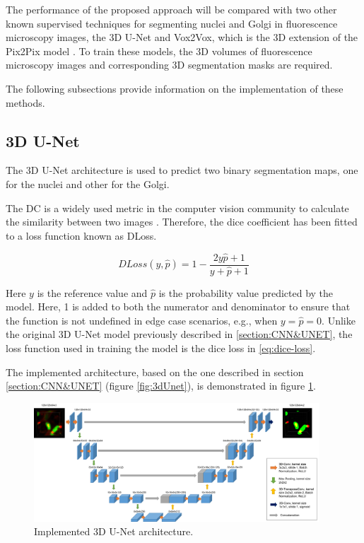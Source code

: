 The performance of the proposed approach will be compared with two other known supervised techniques for segmenting nuclei and Golgi in fluorescence microscopy images, the 3D U-Net \cite{Unet:3D} and Vox2Vox, which is the 3D extension of the Pix2Pix model \cite{isola2018imagetoimage}. To train these models, the 3D volumes of fluorescence microscopy images and corresponding 3D segmentation masks are required.

The following subsections provide information on the implementation of these methods.

\subsection{3D U-Net}

The 3D U-Net architecture is used to predict two binary segmentation maps, one for the nuclei and other for the Golgi.

The \ac{DC} is a widely used metric in the computer vision community to calculate the similarity between two images \cite{diceloss}. Therefore, the dice coefficient has been fitted to a loss function known as \ac{DLoss}.

\begin{equation}
    DLoss(y,\hat{p}) = 1 - \frac{2y\hat{p}+1}{y+\hat{p}+1}
    \label{eq:dice-loss}
\end{equation}

Here $y$ is the reference value and $\hat{p}$ is the probability value predicted by the model. Here, 1 is added to both the numerator and denominator to ensure that the function is not undefined in edge case scenarios, e.g., when $y=\hat{p}=0$. Unlike the original 3D U-Net model \cite{Unet:3D} previously described in \ref{section:CNN&UNET}, the loss function used in training the model is the dice loss in \ref{eq:dice-loss}.

The implemented architecture, based on the one described in section \ref{section:CNN&UNET} (figure \ref{fig:3dUnet}), is demonstrated in figure \ref{fig:y-unet-3d}.

\begin{figure}[!htb]
  \centering
  \includegraphics[width=0.95\textwidth]{Images/Picture1.jpg}
  \caption[Implemented 3D U-Net architecture.]{Implemented 3D U-Net architecture.}
  \label{fig:y-unet-3d}
\end{figure}

